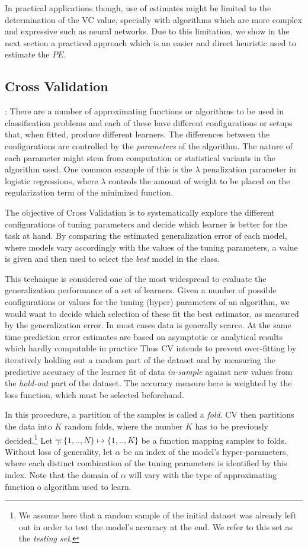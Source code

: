 In practical applications though, use of estimates might be limited to the determination of the VC value, specially with algorithms which are more complex and expressive such as neural networks. Due to this limitation, we show in the next section a practiced approach which is an easier and direct heuristic used to estimate the $PE$.


\subsection{Cross Validation}:
 There are a number of approximating functions or algorithms to be used in classification problems and each of these have different configurations or setups that, when fitted, produce different learners. The differences between the configurations are controlled by the \textit{parameters} of the algorithm. The nature of each parameter might stem from computation or statistical variants in the algorithm used. One common example of this is the $\lambda$ penalization parameter in logistic regressions, where $\lambda$ controls the amount of weight to be placed on the regularization term of the minimized function.

The objective of Cross Validation is to systematically explore the different configurations of tuning parameters and decide which learner is better for the task at hand. By comparing the estimated generalization error of each model, where models vary accordingly with the values of the tuning parameters, a value is given and then used to select the \textit{best} model in the class.

This technique is considered one of the most widespread to evaluate the generalization performance of a set of learners. Given a number of possible configurations or values for the tuning (hyper) parameters of an algorithm, we would want to decide which selection of these fit the best estimator, as measured by the generalization error. In most cases data is generally scarce. At the same time prediction error estimates are based on asymptotic or analytical results which hardly computable in practice Thus CV intends to prevent over-fitting by iteratively holding out a random part of the dataset and by measuring the predictive accuracy of the learner fit of data \textit{in-sample} against new values from the \textit{hold-out} part of the dataset. The accuracy measure here is weighted by the loss function, which must be selected beforehand.

In this procedure, a partition of the samples is called a \textit{fold}. CV then partitions the data into $K$ random folds, where the number $K$ has to be previously decided.\footnote{ We assume here that a random sample of the initial dataset was already left out in order to test the model's accuracy at the end. We refer to this set as the \textit{testing set}.} Let $\gamma : \{1,..,N\} \mapsto \{1, .., K\}$ be a function mapping samples to folds. Without loss of generality,  let $\alpha$ be an index of the model's hyper-parameters, where each distinct combination of the tuning parameters is identified by this index. Note that the domain of $\alpha$ will vary with the type of approximating function o algorithm used to learn.


